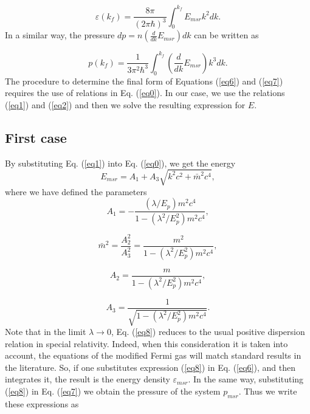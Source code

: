 \documentclass[final,5p,times,twocolumn]{elsarticle}
\begin{document}
\begin{equation}
    \varepsilon(k_f)=\frac{8 \pi}{(2 \pi \hbar)^3} \int_0^{k_f} E_{msr} k^2 dk.
    \label{eq6}
\end{equation}
In a similar way, the pressure $dp= n (\frac{d}{dk}E_{msr}) dk$ can be written as

\begin{equation}
    p(k_f)=\frac{1}{3 \pi^2 \hbar^3} \int_0^{k_f} \left(\frac{d}{dk}E_{msr}\right) k^3 dk
    \label{eq7}.
\end{equation}
The procedure to determine the final form of Equations (\ref{eq6}) and (\ref{eq7}) requires the use of  relations in Eq. (\ref{eq0}). In our case, we use the relations (\ref{eq1}) and (\ref{eq2}) and then we solve the resulting expression for $E$.   

\subsection{First case}

By substituting Eq. (\ref{eq1}) into Eq. (\ref{eq0}), we get the energy
\begin{equation}
    E_{msr}= A_1 + A_3 \sqrt{k^2 c^2 + \bar{m}^2 c^4},
    \label{eq8}
\end{equation}
where we have defined the parameters
\begin{equation}
    A_1= -\frac{(\lambda/E_p) m^2 c^4 }{1- (\lambda^2 /E_p^2) m^2 c^4 },
    \label{eq9}
\end{equation}

\begin{equation}
    \bar{m}^2= \frac{A_2^2}{A_3^2}=\frac{m^2}{1- (\lambda^2 /E_p^2) m^2 c^4 },
    \label{eq10}
\end{equation}

\begin{equation}
    A_2= \frac{m}{1- (\lambda^2 /E_p^2) m^2 c^4 },
    \label{eq11}
\end{equation}

\begin{equation}
    A_3= \frac{1}{\sqrt{1- (\lambda^2 /E_p^2) m^2 c^4 }}.
    \label{eq12}
\end{equation}
Note that in the limit $\lambda \rightarrow 0$, Eq. (\ref{eq8}) reduces to the usual positive  dispersion relation in special relativity. Indeed, when this consideration it is taken into account, the equations of the modified Fermi gas will match standard results in the literature. So, if one substitutes expression (\ref{eq8}) in Eq. (\ref{eq6}), and then integrates it, the result is the energy density $\varepsilon_{msr}$. In the same way, substituting (\ref{eq8}) in Eq. (\ref{eq7}) we obtain the pressure of the system $p_{msr}$. Thus we write these expressions as    
\end{document}

